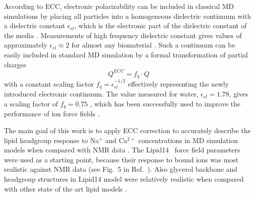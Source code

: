 \documentclass[aip,jcp,twocolumn]{revtex4}
\begin{document}

According to ECC, electronic
polarizability can be included in classical MD simulations by
placing all particles into a homogeneous dielectric continuum 
with a dielectric constant $\epsilon _{el}$, 
which is the electronic part of the dielectric constant of 
the media \cite{leontyev11}. Measurements of high frequency 
dielectric constant gives values of approximately $\epsilon _{el} \approx 2$ 
for almost any biomaterial \cite{some_original_work, leontyev11}.
Such a continuum can be easily included in standard MD simulation by
a formal transformation of partial charges 
\begin{equation}
  Q^{ECC} = f_q \cdot Q
\end{equation}
with a constant scaling factor $f_q = \epsilon _{el} ^{-1/2}$ 
effectively representing the newly introduced electronic continuum. 
The value measured for water, $\epsilon _{el} = 1.78$, gives 
a scaling factor of $f_q = 0.75$ \cite{some_orig_source, leontyev11}, which has been
successfully used to improve the performance of ion force fields \cite{kohagen14,kohagen16,??}. 

The main goal of this work is to apply ECC correction to accurately 
describe the lipid headgroup response to Na$^+$ and Ca$^{2+}$ concentrations
in MD simulation models when compared with NMR data \cite{catte16}. 
The Lipid14~\cite{dickson14} force field parameters were used as a starting point,
because their response to bound ions was most realistic against NMR data
(see Fig.~5 in Ref.~).
Also glycerol backbone and headgroup structures in Lipid14 model were
relatively realistic when compared with other state of the art lipid models \cite{botan15}.
\end{document}
